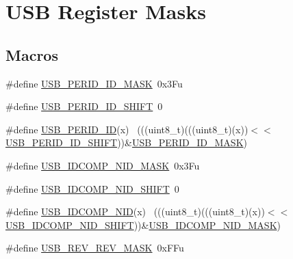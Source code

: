 \hypertarget{group___u_s_b___register___masks}{}\section{U\+SB Register Masks}
\label{group___u_s_b___register___masks}
\subsection*{Macros}
\begin{DoxyCompactItemize}
\item 
\#define \hyperlink{group___u_s_b___register___masks_ga7c4ef4c7ba738b9ec7ee90c6c482c1e5}{U\+S\+B\+\_\+\+P\+E\+R\+I\+D\+\_\+\+I\+D\+\_\+\+M\+A\+SK}~0x3\+Fu
\item 
\#define \hyperlink{group___u_s_b___register___masks_ga15b2af97cadcb108b2489e2d29e8957e}{U\+S\+B\+\_\+\+P\+E\+R\+I\+D\+\_\+\+I\+D\+\_\+\+S\+H\+I\+FT}~0
\item 
\#define \hyperlink{group___u_s_b___register___masks_ga9866908546596794c6ec34ce8e7ee9ab}{U\+S\+B\+\_\+\+P\+E\+R\+I\+D\+\_\+\+ID}(x)                                                ~(((uint8\+\_\+t)(((uint8\+\_\+t)(x))$<$$<$\hyperlink{group___u_s_b___register___masks_ga15b2af97cadcb108b2489e2d29e8957e}{U\+S\+B\+\_\+\+P\+E\+R\+I\+D\+\_\+\+I\+D\+\_\+\+S\+H\+I\+FT}))\&\hyperlink{group___u_s_b___register___masks_ga7c4ef4c7ba738b9ec7ee90c6c482c1e5}{U\+S\+B\+\_\+\+P\+E\+R\+I\+D\+\_\+\+I\+D\+\_\+\+M\+A\+SK})
\item 
\#define \hyperlink{group___u_s_b___register___masks_ga91e5cef0c6203ea503c01ecb0f392819}{U\+S\+B\+\_\+\+I\+D\+C\+O\+M\+P\+\_\+\+N\+I\+D\+\_\+\+M\+A\+SK}~0x3\+Fu
\item 
\#define \hyperlink{group___u_s_b___register___masks_gabb5fe5f72dcf289ba2d624ed18f8f07a}{U\+S\+B\+\_\+\+I\+D\+C\+O\+M\+P\+\_\+\+N\+I\+D\+\_\+\+S\+H\+I\+FT}~0
\item 
\#define \hyperlink{group___u_s_b___register___masks_ga45629f99413060a8de87dd44e42f4f31}{U\+S\+B\+\_\+\+I\+D\+C\+O\+M\+P\+\_\+\+N\+ID}(x)                                            ~(((uint8\+\_\+t)(((uint8\+\_\+t)(x))$<$$<$\hyperlink{group___u_s_b___register___masks_gabb5fe5f72dcf289ba2d624ed18f8f07a}{U\+S\+B\+\_\+\+I\+D\+C\+O\+M\+P\+\_\+\+N\+I\+D\+\_\+\+S\+H\+I\+FT}))\&\hyperlink{group___u_s_b___register___masks_ga91e5cef0c6203ea503c01ecb0f392819}{U\+S\+B\+\_\+\+I\+D\+C\+O\+M\+P\+\_\+\+N\+I\+D\+\_\+\+M\+A\+SK})
\item 
\#define \hyperlink{group___u_s_b___register___masks_ga72a356a066674e41e3827b0ccb931e71}{U\+S\+B\+\_\+\+R\+E\+V\+\_\+\+R\+E\+V\+\_\+\+M\+A\+SK}~0x\+F\+Fu

\end{DoxyCompactItemize}
